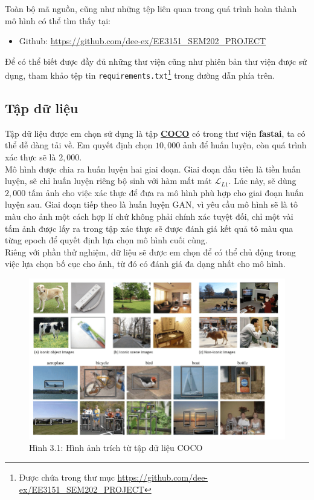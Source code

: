 \documentclass[a4paper]{article}
\begin{document}
\noindent
Toàn bộ mã nguồn, cũng như những tệp liên quan trong quá trình hoàn thành mô hình có thể tìm thấy tại:
\begin{itemize}
    \item Github: \href{https://github.com/dee-ex/EE3151\_SEM202\_PROJECT}{https://github.com/dee-ex/EE3151\_SEM202\_PROJECT}
\end{itemize}
Để có thể biết được đầy đủ những thư viện cũng như phiên bản thư viện được sử dụng, tham khảo tệp tin \texttt{requirements.txt}\footnote{Được chứa trong thư mục \href{https://github.com/dee-ex/EE3151\_SEM202\_PROJECT}{https://github.com/dee-ex/EE3151\_SEM202\_PROJECT}} trong đường dẫn phía trên.

\subsection{Tập dữ liệu}
Tập dữ liệu được em chọn sử dụng là tập \href{https://cocodataset.org/#download}{\textbf{COCO}} có trong thư viện \textbf{fastai}, ta có thể dễ dàng tải về. Em quyết định chọn $10,000$ ảnh để huấn luyện, còn quá trình xác thực sẽ là $2,000$.\\
Mô hình được chia ra huấn luyện hai giai đoạn. Giai đoạn đầu tiên là tiền huấn luyện, sẽ chỉ huấn luyện riêng bộ sinh với hàm mất mát $\mathcal{L}_{L1}$. Lúc này, sẽ dùng $2,000$ tấm ảnh cho việc xác thực để đưa ra mô hình phù hợp cho giai đoạn huấn luyện sau. Giai đoạn tiếp theo là huấn luyện GAN, vì yêu cầu mô hình sẽ là  tô màu cho ảnh một cách hợp lí chứ không phải chính xác tuyệt đối, chỉ một vài tấm ảnh được lấy ra trong tập xác thực sẽ được đánh giá kết quả tô màu qua từng epoch để quyết định lựa chọn mô hình cuối cùng.\\
Riêng với phần thử nghiệm, dữ liệu sẽ được em chọn để có thể chủ động trong việc lựa chọn bố cục cho ảnh, từ đó có đánh giá đa dạng nhất cho mô hình.

\begin{figure}[h!]
\centering
\includegraphics[width=12cm]{images/3_1.png}
\caption{Hình 3.1: Hình ảnh trích từ tập dữ liệu COCO}
\end{figure}
\end{document}
